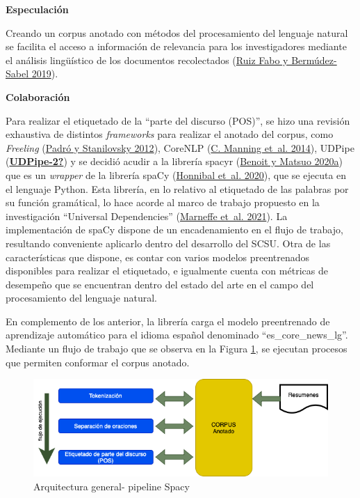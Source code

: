 \documentclass[
  12pt,
  openany]{book}
\begin{document}
\textbf{Especulación}

Creando un corpus anotado con métodos del procesamiento del lenguaje natural se facilita el acceso a información de relevancia para los investigadores mediante el análisis lingüístico de los documentos recolectados (\protect\hyperlink{ref-article}{Ruiz Fabo y Bermúdez-Sabel 2019}).

\textbf{Colaboración}

Para realizar el etiquetado de la ``parte del discurso (POS)'', se hizo una revisión exhaustiva de distintos \emph{frameworks} para realizar el anotado del corpus, como \emph{Freeling} (\protect\hyperlink{ref-padro12}{Padró y Stanilovsky 2012}), CoreNLP (\protect\hyperlink{ref-manning-etal-2014-stanford}{C. Manning et~al. 2014}), UDPipe (\protect\hyperlink{ref-UDPipe-2}{\textbf{UDPipe-2?}}) y se decidió acudir a la librería spacyr (\protect\hyperlink{ref-spacyr}{Benoit y Matsuo 2020a}) que es un \emph{wrapper} de la librería spaCy (\protect\hyperlink{ref-spacy2020}{Honnibal et~al. 2020}), que se ejecuta en el lenguaje Python. Esta librería, en lo relativo al etiquetado de las palabras por su función gramátical, lo hace acorde al marco de trabajo propuesto en la investigación ``Universal Dependencies'' (\protect\hyperlink{ref-demarneffe2021}{Marneffe et~al. 2021}). La implementación de spaCy dispone de un encadenamiento en el flujo de trabajo, resultando conveniente aplicarlo dentro del desarrollo del SCSU. Otra de las características que dispone, es contar con varios modelos preentrenados disponibles para realizar el etiquetado, e igualmente cuenta con métricas de desempeño que se encuentran dentro del estado del arte en el campo del procesamiento del lenguaje natural.

En complemento de los anterior, la librería carga el modelo preentrenado de aprendizaje automático para el idioma español denominado ``es\_core\_news\_lg''. Mediante un flujo de trabajo que se observa en la Figura \ref{fig:spacypi}, se ejecutan procesos que permiten conformar el corpus anotado.

\begin{figure}

{\centering \includegraphics[width=0.8\linewidth]{images/05-desarrollo/2_ciclo/nlp/spacy_pipeline1} 

}

\caption{Arquitectura general- pipeline Spacy}\label{fig:spacypi}
\end{figure}
\end{document}
